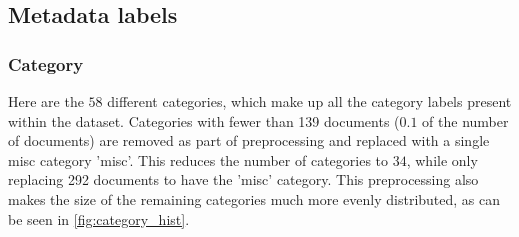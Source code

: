\subsection{Metadata labels}\label{sec:appendix_meta_data}

\subsubsection{Category}\label{subsec:appendix_category}

Here are the $58$ different categories, which make up all the category labels present within the dataset.
Categories with fewer than 139 documents ($0.1$ of the number of documents) are removed as part of preprocessing and replaced with a single misc category 'misc'.
This reduces the number of categories to $34$, while only replacing 292 documents to have the 'misc' category.
This preprocessing also makes the size of the remaining categories much more evenly distributed, as can be seen in \autoref{fig:category_hist}.

